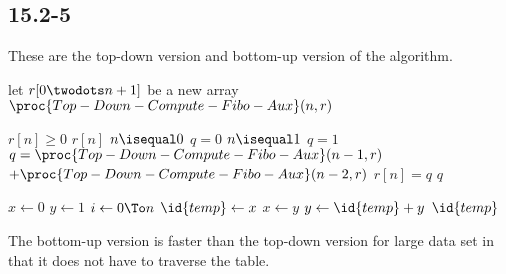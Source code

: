 \subsection{15.2-5}
    These are the top-down version and bottom-up version
    of the algorithm.
    \begin{codebox}
        \li let $r[0\twodots n+1]$ be a new array
        \li $\proc{Top-Down-Compute-Fibo-Aux}(n, r)$
    \end{codebox}
    \begin{codebox}
        \li \If $r[n] \ge 0$
            \Then
        \li     \Return $r[n]$
            \End
        \li \If $n \isequal 0$
            \Then
        \li     $q = 0$
        \li \ElseIf $n \isequal 1$
            \Then
        \li     $q = 1$
        \li \Else 
        \li     $q = \proc{Top-Down-Compute-Fibo-Aux}(n-1, r)$
        \zi     $+ \proc{Top-Down-Compute-Fibo-Aux}(n-2, r)$
            \End
        \li $r[n] = q$
        \li \Return $q$
    \end{codebox}
    \begin{codebox}
        \li $x \gets 0$
        \li $y \gets 1$
        \li \For $i \gets 0 \To n$
            \Do
        \li     $\id{temp}\gets x$
        \li     $x \gets y$
        \li     $y \gets \id{temp}+y$
            \End
        \li \Return $\id{temp}$
    \end{codebox}
    The bottom-up version is faster than the 
    top-down version for large data set 
    in that it does not have to
    traverse the table.
